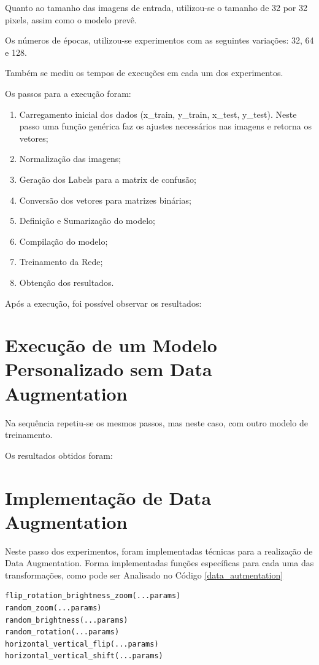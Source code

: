 \documentclass[12pt]{article}
\begin{document}
Quanto ao tamanho das imagens de entrada, utilizou-se o tamanho de 32 por 32 pixels, assim como o modelo prevê.

Os números de épocas, utilizou-se experimentos com as seguintes variações: 32, 64 e 128.

Também se mediu os tempos de execuções em cada um dos experimentos.

Os passos para a execução foram:

\begin{enumerate}
  \item Carregamento inicial dos dados (x\_train, y\_train, x\_test, y\_test). Neste passo uma função genérica faz os ajustes necessários nas imagens e retorna os vetores;
  \item Normalização das imagens;
  \item Geração dos Labels para a matrix de confusão;
  \item Conversão dos vetores para matrizes binárias;
  \item Definição e Sumarização do modelo;
  \item Compilação do modelo;
  \item Treinamento da Rede;
  \item Obtenção dos resultados.
\end{enumerate}

Após a execução, foi possível observar os resultados:

\section{Execução de um Modelo Personalizado sem Data Augmentation}

Na sequência repetiu-se os mesmos passos, mas neste caso, com outro modelo de treinamento.

Os resultados obtidos foram:

\section{Implementação de Data Augmentation}

Neste passo dos experimentos, foram implementadas técnicas para a realização de Data Augmentation. Forma implementadas funções específicas para cada uma das transformações, como pode ser Analisado no Código \ref{data_autmentation}

\begin{lstlisting}[caption={Funções de Transformação das Imagens},captionpos=b,frame=single,label={code:data_autmentation}]
flip_rotation_brightness_zoom(...params)
random_zoom(...params)
random_brightness(...params)
random_rotation(...params)
horizontal_vertical_flip(...params)
horizontal_vertical_shift(...params)
\end{lstlisting}
\end{document}
